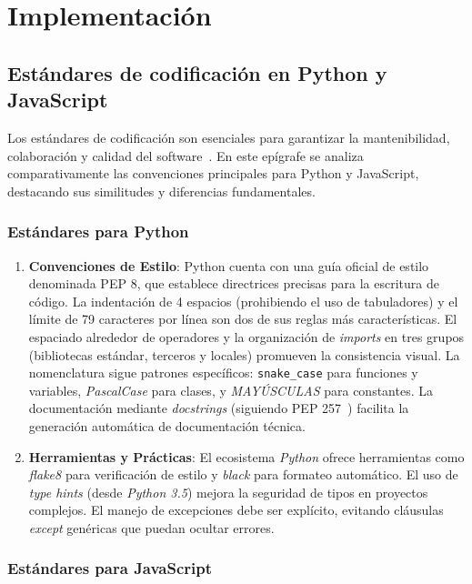 \section{Implementación}

\subsection{Estándares de codificación en Python y JavaScript}

Los estándares de codificación son esenciales para garantizar la mantenibilidad, colaboración y calidad del software~\cite{van2001pep}. En este epígrafe se analiza comparativamente las convenciones principales para Python y JavaScript, destacando sus similitudes y diferencias fundamentales.

\subsubsection{Estándares para Python}

\begin{enumerate}
	\item \textbf{Convenciones de Estilo}: Python cuenta con una guía oficial de estilo denominada PEP 8, que establece directrices precisas para la escritura de código. La indentación de 4 espacios (prohibiendo el uso de tabuladores) y el límite de 79 caracteres por línea son dos de sus reglas más características. El espaciado alrededor de operadores y la organización de \textit{imports} en tres grupos (bibliotecas estándar, terceros y locales) promueven la consistencia visual. La nomenclatura sigue patrones específicos: \texttt{snake\_case} para funciones y variables, \textit{PascalCase} para clases, y \textit{MAYÚSCULAS} para constantes\cite{van2001pep}. La documentación mediante \textit{docstrings} (siguiendo PEP 257~\cite{PEP257}) facilita la generación automática de documentación técnica.
	\item \textbf{Herramientas y Prácticas}: El ecosistema \textit{Python} ofrece herramientas como \textit{flake8} para verificación de estilo y \textit{black} para formateo automático. El uso de \textit{type hints} (desde \textit{Python 3.5}) mejora la seguridad de tipos en proyectos complejos. El manejo de excepciones debe ser explícito, evitando cláusulas \textit{except} genéricas que puedan ocultar errores.
\end{enumerate}

\subsubsection{Estándares para JavaScript}

